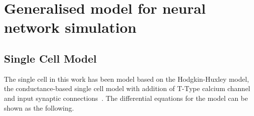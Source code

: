%


\section{Generalised model for neural network simulation}
\subsection{Single Cell Model}

The single cell in this work has been model based on the Hodgkin-Huxley model, the conductance-based single cell model with addition of T-Type calcium channel and input synaptic connections~\cite{hodgkin1952quantitative, wang1991model, paik2009spontaneous}. The differential equations for the model can be shown as the following.

